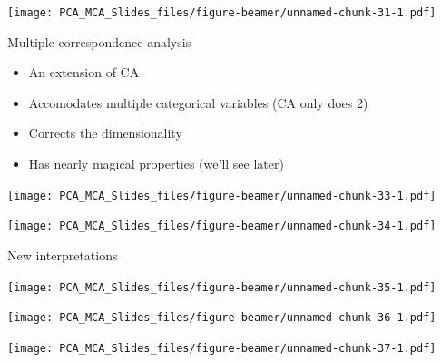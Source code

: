 \documentclass[
  ignorenonframetext,
]{beamer}
\providecommand{\tightlist}{%
  \setlength{\itemsep}{0pt}\setlength{\parskip}{0pt}}
\begin{document}
\begin{frame}

\texttt{[image: PCA\_MCA\_Slides\_files/figure-beamer/unnamed-chunk-31-1.pdf]}

\end{frame}

\begin{frame}{Multiple correspondence analysis}
\protect\hypertarget{multiple-correspondence-analysis}{}

\begin{itemize}[<+->]
\tightlist
\item
  An extension of CA
\item
  Accomodates multiple categorical variables (CA only does 2)
\item
  Corrects the dimensionality
\item
  Has nearly magical properties (we'll see later)
\end{itemize}

\end{frame}

\begin{frame}

\texttt{[image: PCA\_MCA\_Slides\_files/figure-beamer/unnamed-chunk-33-1.pdf]}

\end{frame}

\begin{frame}

\texttt{[image: PCA\_MCA\_Slides\_files/figure-beamer/unnamed-chunk-34-1.pdf]}

\end{frame}

\begin{frame}{New interpretations}
\protect\hypertarget{new-interpretations}{}

\end{frame}

\begin{frame}

\texttt{[image: PCA\_MCA\_Slides\_files/figure-beamer/unnamed-chunk-35-1.pdf]}

\end{frame}

\begin{frame}

\texttt{[image: PCA\_MCA\_Slides\_files/figure-beamer/unnamed-chunk-36-1.pdf]}

\end{frame}

\begin{frame}

\texttt{[image: PCA\_MCA\_Slides\_files/figure-beamer/unnamed-chunk-37-1.pdf]}

\end{frame}
\end{document}
